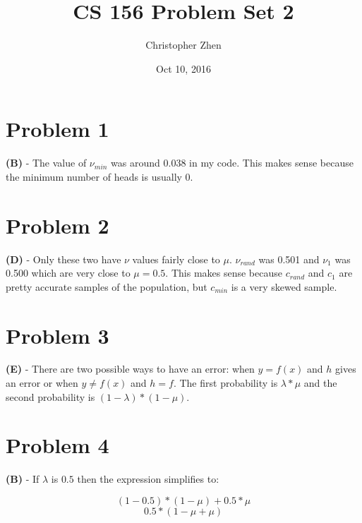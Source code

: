 \documentclass[10pt,letter]{article}
\begin{document}


\title{CS 156 Problem Set 2}

\author{Christopher Zhen}

\date{Oct 10, 2016}
 
\maketitle 


\section*{Problem 1}

\textbf{(B)} - The value of $\nu _{min}$ was around 0.038 in my code. This makes sense because the minimum number of heads is usually 0.

\section*{Problem 2}

\textbf{(D)} - Only these two have $\nu$ values fairly close to $\mu$. $\nu _{rand}$ was 0.501 and $\nu _{1}$ was 0.500 which are very close to $\mu = 0.5$. This makes sense because $c _{rand}$ and $c _{1}$ are pretty accurate samples of the population, but $c _{min}$ is a very skewed sample.


\section*{Problem 3} 

\textbf{(E)} - There are two possible ways to have an error: when $y = f(x)$ and $h$ gives an error or when $y \neq f(x)$ and $h = f$. The first probability is $\lambda * \mu$ and the second probability is $(1-\lambda)*(1-\mu)$.


\section*{Problem 4}

\textbf{(B)} - If $\lambda$ is $0.5$ then the expression simplifies to:

\begin{equation}
(1-0.5)*(1-\mu) + 0.5*\mu
\end{equation}
\begin{equation}
0.5*(1-\mu + \mu)
\end{equation}
\end{document}
